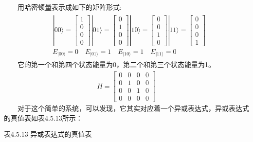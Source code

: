 \documentclass[a4paper,11pt,english]{sphinxmanual}
\begin{document}
\sphinxAtStartPar
  用哈密顿量表示成如下的矩阵形式:
\begin{equation*}
\begin{split}\begin{aligned} &|00\rangle=\left[\begin{array}{l} 1 \\ 0 \\ 0 \\ 0 \end{array}\right]|01\rangle=\left[\begin{array}{l} 0 \\ 1 \\ 0 \\ 0 \end{array}\right]|10\rangle=\left[\begin{array}{l} 0 \\ 0 \\ 1 \\ 0 \end{array}\right]|11\rangle=\left[\begin{array}{l} 0 \\ 0 \\ 0 \\ 1 \end{array}\right] \\ &E_{|00\rangle}=0 \quad E_{|01\rangle}=1 \quad E_{|10\rangle}=1 \quad E_{|11\rangle}=0 \end{aligned}\end{split}
\end{equation*}
\sphinxAtStartPar
  它的第一个和第四个状态能量为0，第二个和第三个状态能量为1。
\begin{equation*}
\begin{split}H=\left[\begin{array}{llll} 0 & 0 & 0 & 0 \\ 0 & 1 & 0 & 0 \\ 0 & 0 & 1 & 0 \\ 0 & 0 & 0 & 0 \end{array}\right]\end{split}
\end{equation*}
\sphinxAtStartPar
  对于这个简单的系统，可以发现，它其实对应着一个异或表达式，异或表达式的真值表如表4.5.13所示：

\begin{center}表4.5.13 异或表达式的真值表
\end{center}
\end{document}
